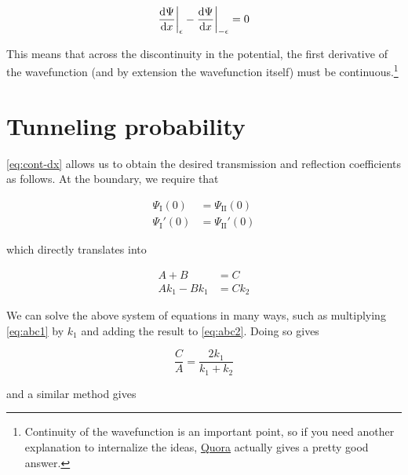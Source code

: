 \begin{tcolorbox}[title = Continuity of the wavefunction] \vspace{-2ex}
	\begin{equation}
		\dv{\Psi}{x} \bigg|_{\epsilon} - \dv{\Psi}{x} \bigg|_{-\epsilon} = 0 \label{eq:cont-dx}
	\end{equation}
\end{tcolorbox}

This means that across the discontinuity in the potential, the first derivative of the wavefunction (and by extension the wavefunction itself) must be continuous.\footnote{Continuity of the wavefunction is an important point, so if you need another explanation to internalize the ideas, \href{https://www.quora.com/Why-does-the-wave-function-have-to-be-continuous}{Quora} actually gives a pretty good answer.} 


\section{Tunneling probability}

\autoref{eq:cont-dx} allows us to obtain the desired transmission and reflection coefficients as follows. 
At the boundary, we require that 

\begin{align*}
	\Psi_{\text{I}}(0) &= \Psi_{\text{II}}(0) \\
	\Psi_{\text{I}}'(0) &= \Psi_{\text{II}}'(0)
\end{align*}

\noindent which directly translates into

\begin{align}
	A + B &= C \label{eq:abc1} \\
	Ak_1 - Bk_1 &= Ck_2 \label{eq:abc2}
\end{align}

We can solve the above system of equations in many ways, such as multiplying \autoref{eq:abc1} by $k_1$ and adding the result to \autoref{eq:abc2}. 
Doing so gives

\begin{equation}
	\frac{C}{A} = \frac{2k_1}{k_1+k_2} \label{eq:c-a}
\end{equation}

\noindent and a similar method gives 

